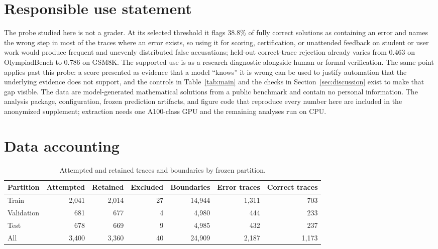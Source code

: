 \documentclass{article}
\begin{document}
\section*{Responsible use statement}

The probe studied here is not a grader. At its selected threshold it flags $38.8\%$ of fully
correct solutions as containing an error and names the wrong step in most of the traces where an
error exists, so using it for scoring, certification, or unattended feedback on student or user work
would produce frequent and unevenly distributed false accusations; held-out correct-trace rejection
already varies from $0.463$ on OlympiadBench to $0.786$ on GSM8K. The supported use is as a research
diagnostic alongside human or formal verification. The same point applies past this probe: a score
presented as evidence that a model ``knows'' it is wrong can be used to justify
automation that the underlying evidence does not support, and the controls in
Table~\ref{tab:main} and the checks in Section~\ref{sec:discussion} exist to make that gap visible.
The data are model-generated mathematical solutions from a public benchmark and contain no personal information.
The analysis package, configuration, frozen prediction artifacts, and figure code that reproduce
every number here are included in the anonymized supplement; extraction needs one A100-class GPU
and the remaining analyses run on CPU.




\appendix

\section{Data accounting}
\label{app:data}

\begin{table}[h]
\centering
\small
\caption{Attempted and retained traces and boundaries by frozen partition.}
\label{tab:dataflow}
\begin{tabular}{lrrrrrr}
\toprule
Partition & Attempted & Retained & Excluded & Boundaries & Error traces & Correct traces \\
\midrule
Train & 2,041 & 2,014 & 27 & 14,944 & 1,311 & 703 \\
Validation & 681 & 677 & 4 & 4,980 & 444 & 233 \\
Test & 678 & 669 & 9 & 4,985 & 432 & 237 \\
\midrule
All & 3,400 & 3,360 & 40 & 24,909 & 2,187 & 1,173 \\
\bottomrule
\end{tabular}
\end{table}
\end{document}
